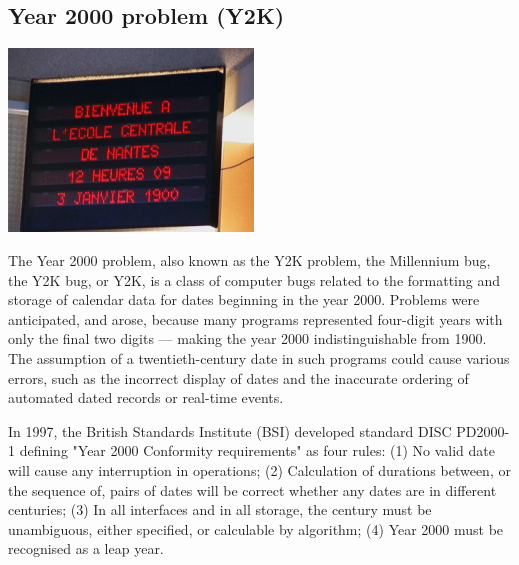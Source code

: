 \documentclass[11pt]{report}
\begin{document}
\subsection{Year 2000 problem (Y2K)}
\vspace{2mm}\begin{center}\includegraphics[width=6.5cm]{./img/y2k.jpg}\end{center}
The Year 2000 problem, also known as the Y2K problem, the Millennium bug, the Y2K bug, or Y2K, is a class of computer bugs related to the formatting and storage of calendar data for dates beginning in the year 2000. Problems were anticipated, and arose, because many programs represented four-digit years with only the final two digits — making the year 2000 indistinguishable from 1900. The assumption of a twentieth-century date in such programs could cause various errors, such as the incorrect display of dates and the inaccurate ordering of automated dated records or real-time events.

In 1997, the British Standards Institute (BSI) developed standard DISC PD2000-1 defining "Year 2000 Conformity requirements" as four rules: (1) No valid date will cause any interruption in operations; (2) Calculation of durations between, or the sequence of, pairs of dates will be correct whether any dates are in different centuries; (3) In all interfaces and in all storage, the century must be unambiguous, either specified, or calculable by algorithm; (4) Year 2000 must be recognised as a leap year.
\end{document}
